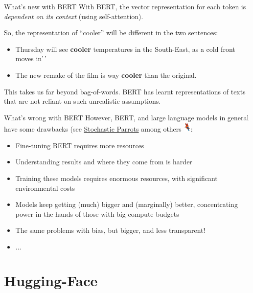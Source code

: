 \documentclass[
  10pt,
  ignorenonframetext,
  aspectratio=169]{beamer}
\providecommand{\tightlist}{%
  \setlength{\itemsep}{0pt}\setlength{\parskip}{0pt}}
\begin{document}
\begin{frame}{What's new with BERT}
\protect\hypertarget{whats-new-with-bert}{}
With BERT, the vector representation for each token is \emph{dependent
on its context} (using self-attention).

So, the representation of ``cooler'' will be different in the two
sentences:

\begin{itemize}
\tightlist
\item
  Thursday will see \textbf{cooler} temperatures in the South-East, as a
  cold front moves in'\,'
\item
  The new remake of the film is way \textbf{cooler} than the original.
\end{itemize}

This takes us far beyond bag-of-words. BERT has learnt representations
of texts that are not reliant on such unrealistic assumptions.
\end{frame}

\begin{frame}{What's wrong with BERT}
\protect\hypertarget{whats-wrong-with-bert}{}
However, BERT, and large language models in general have some drawbacks
(see \href{https://dl.acm.org/doi/10.1145/3442188.3445922}{Stochastic
Parrots} among others \includegraphics[height=0.5cm]{images/parrot.png}:

\begin{itemize}
  \item<1->Fine-tuning BERT requires more resources
  \item<2->Understanding results and where they come from is harder
  \item<3->Training these models requires enormous resources, with significant environmental costs
  \item<4->Models keep getting (much) bigger and (marginally) better, concentrating power in the hands of those with big compute budgets
  \item<5->The same problems with bias, but bigger, and less transparent!
  \item<6->...
\end{itemize}
\end{frame}

\hypertarget{hugging-face}{%
\section{Hugging-Face}\label{hugging-face}}
\end{document}
